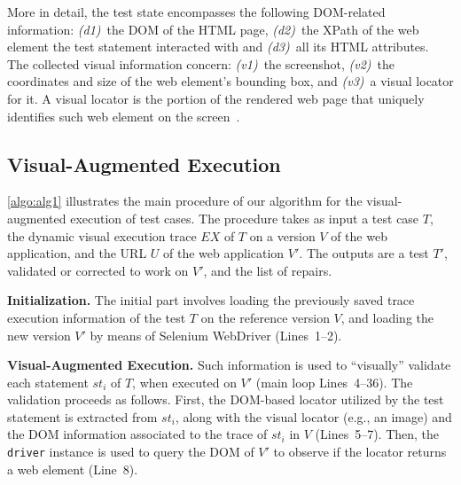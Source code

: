
More in detail, the test state encompasses the following DOM-related information: \textit{(d1)}~the DOM of the HTML page, \textit{(d2)}~the XPath of the web element the test statement interacted with and \textit{(d3)}~all its HTML attributes. The collected visual information concern: \textit{(v1)}~the screenshot, \textit{(v2)}~the coordinates and size of the web element's bounding box, and \textit{(v3)}~a visual locator for it. A visual locator is the portion of the rendered web page that uniquely identifies such web element on the screen~\cite{2015-Leotta-SAC}. 
%

\subsection{Visual-Augmented Execution}

\autoref{algo:alg1} illustrates the main procedure of our algorithm for the visual-augmented execution of test cases. The procedure takes as input a test case $T$, 
the dynamic visual execution trace $EX$ of $T$ on a version $V$ of the web application, and the URL $U$ of the web application $V'$. The outputs are a test $T'$, validated or corrected to work on $V'$, and the list of repairs. 

\noindent
\textbf{Initialization.} 
The initial part involves loading the previously saved trace execution information of the test $T$ on the reference version $V$, and loading the new version $V'$ by means of Selenium WebDriver (Lines~1--2). 

\noindent
\textbf{Visual-Augmented Execution.}
Such information is used to ``visually'' validate each statement $st_i$ of $T$, when executed on $V'$ (main loop Lines~4--36). The validation proceeds as follows. First, the DOM-based locator utilized by the test statement is extracted from $st_i$, along with the visual locator (e.g., an image) and the DOM information associated to the trace of $st_i$ in $V$  (Lines~5--7). Then, the \texttt{driver} instance is used to query the DOM of $V'$ to observe if the locator returns a web element (Line~8). 

